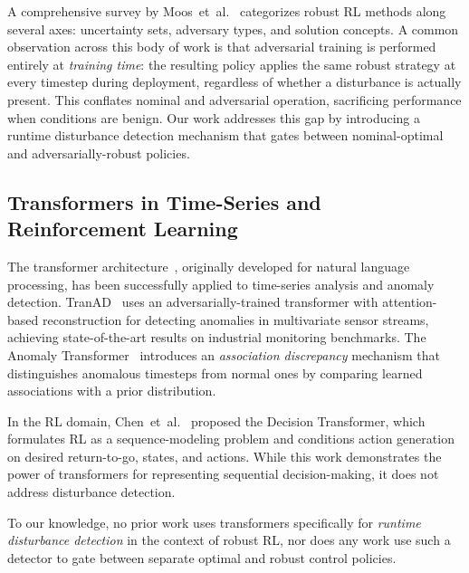 \documentclass[conference]{IEEEtran}
\begin{document}
A comprehensive survey by Moos~et~al.~\cite{moos2022robust} categorizes
robust RL methods along several axes: uncertainty sets, adversary types,
and solution concepts.  A common observation across this body of work is
that adversarial training is performed entirely at \emph{training time}:
the resulting policy applies the same robust strategy at every timestep
during deployment, regardless of whether a disturbance is actually
present.  This conflates nominal and adversarial operation, sacrificing
performance when conditions are benign.  Our work addresses this gap by
introducing a runtime disturbance detection mechanism that gates between
nominal-optimal and adversarially-robust policies.

\subsection{Transformers in Time-Series and Reinforcement Learning}

The transformer architecture~\cite{vaswani2017attention}, originally
developed for natural language processing, has been successfully applied
to time-series analysis and anomaly detection.
TranAD~\cite{tuli2022tranad} uses an adversarially-trained
transformer with attention-based reconstruction for detecting anomalies
in multivariate sensor streams, achieving state-of-the-art results on
industrial monitoring benchmarks.  The Anomaly
Transformer~\cite{xu2022anomaly} introduces an \emph{association
discrepancy} mechanism that distinguishes anomalous timesteps from normal
ones by comparing learned associations with a prior distribution.

In the RL domain, Chen~et~al.~\cite{chen2021decision} proposed the
Decision Transformer, which formulates RL as a sequence-modeling problem
and conditions action generation on desired return-to-go, states, and
actions.  While this work demonstrates the power of transformers for
representing sequential decision-making, it does not address disturbance
detection.

To our knowledge, no prior work uses transformers specifically for
\emph{runtime disturbance detection} in the context of robust RL,
nor does any work use such a detector to gate between separate
optimal and robust control policies.

\end{document}
